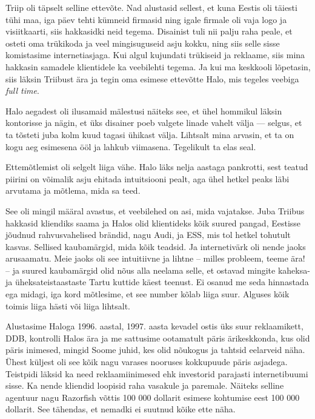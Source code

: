 Triip oli täpselt selline ettevõte. Nad alustasid sellest, et kuna Eestis oli 
täiesti tühi maa, iga päev tehti kümneid firmasid ning igale firmale oli vaja logo 
ja visiitkaarti, siis hakkasidki neid tegema. Disainist tuli nii palju raha peale, 
et osteti oma trükikoda ja veel mingisuguseid asju kokku, ning siis selle 
sisse komistasime internetiasjaga. Kui algul kujundati trükiseid ja 
reklaame, siis mina hakkasin samadele klientidele ka veebilehti tegema. Ja 
kui ma keskkooli lõpetasin, siis läksin Triibust 
ära ja tegin oma esimese ettevõtte 
Halo, mis tegeles veebiga \emph{full time}. 

Halo aegadest oli ilusamaid mälestusi näiteks see, et ühel hommikul läksin 
kontorisse ja nägin, et üks disainer poeb valgete linade vahelt välja ---
selgus, et ta tõsteti juba kolm kuud tagasi ühikast välja. Lihtsalt mina 
arvasin, et ta on kogu aeg esimesena ööl ja lahkub viimasena. Tegelikult ta 
elas seal.


Ettemõtlemist oli selgelt liiga vähe. Halo läks nelja 
aastaga pankrotti, sest teatud piirini on võimalik asju ehitada intuitsiooni 
pealt, aga ühel hetkel peaks läbi arvutama ja mõtlema, mida sa 
teed. 

See oli mingil määral avastus, et veebilehed on asi, mida vajatakse. 
Juba Triibus hakkasid kliendiks saama ja Halos olid 
klientideks kõik suured pangad, Eestisse jõudnud rahvusvahelised 
brändid, nagu Audi, ja ESS, mis tol hetkel tohutult 
kasvas. Sellised kaubamärgid, mida kõik teadsid. Ja internetivärk 
oli nende jaoks arusaamatu. Meie jaoks oli see intuitiivne ja lihtne -- 
milles probleem, teeme ära! -- ja suured kaubamärgid olid 
nõus alla neelama selle, et ostavad mingite kaheksa- ja 
üheksateistaastaste Tartu kuttide käest teenust. Ei osanud me seda hinnastada 
ega midagi, iga kord mõtlesime, et see number kõlab liiga 
suur. Alguses kõik toimis liiga hästi või liiga lihtsalt. 

Alustasime Haloga 1996. aastal, 1997. aasta kevadel ostis üks suur reklaamikett, 
DDB, kontrolli Halos ära ja me sattusime ootamatult päris 
ärikeskkonda, kus olid päris inimesed, mingid Soome juhid, kes olid nõukogus ja 
tahtsid eelarveid näha. Ühest küljest oli 
see kõik nagu varases nooruses kokkupuude päris asjadega. Teistpidi läksid ka 
need reklaamiinimesed ehk investorid
parajasti internetibuumi sisse. Ka nende kliendid loopisid raha vasakule ja 
paremale. Näiteks selline agentuur nagu Razorfish võttis 100 000 dollarit esimese 
kohtumise eest 100 000 dollarit. See tähendas, et nemadki ei 
suutnud kõike ette näha. 

